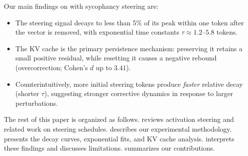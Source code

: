 Our main findings on \qwen with sycophancy steering are:
\begin{itemize}[leftmargin=*,itemsep=0pt,topsep=0pt]
\item The steering signal decays to less than 5\% of its peak within one token after the vector is removed, with exponential time constants $\tau \approx 1.2$--$5.8$ tokens.
\item The KV cache is the primary persistence mechanism: preserving it retains a small positive residual, while resetting it causes a negative rebound (overcorrection; Cohen's $d$ up to $3.41$).
\item Counterintuitively, more initial steering tokens produce \emph{faster} relative decay (shorter $\tau$), suggesting stronger corrective dynamics in response to larger perturbations.
\end{itemize}

The rest of this paper is organized as follows.  reviews activation steering and related work on steering schedules.  describes our experimental methodology.  presents the decay curves, exponential fits, and KV cache analysis.  interprets these findings and discusses limitations.  summarizes our contributions.
